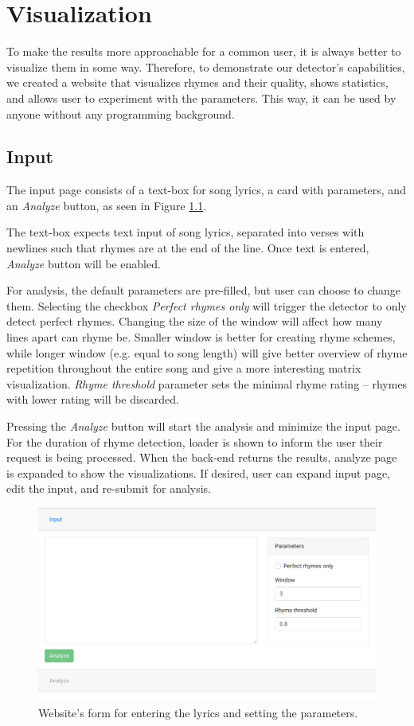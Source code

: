 \chapter{Visualization}\label{visualization}
To make the results more approachable for a common user, it is always better to visualize them in some way. Therefore, to demonstrate our detector's capabilities, we created a website that visualizes rhymes and their quality, shows statistics, and allows user to experiment with the parameters. This way, it can be used by anyone without any programming background.

\section{Input}
The input page consists of a text-box for song lyrics, a card with parameters, and an \textit{Analyze} button, as seen in Figure \ref{web-form}.

The text-box expects text input of song lyrics, separated into verses with newlines such that rhymes are at the end of the line. Once text is entered, \textit{Analyze} button will be enabled.

For analysis, the default parameters are pre-filled, but user can choose to change them. Selecting the checkbox \textit{Perfect rhymes only} will trigger the detector to only detect perfect rhymes. Changing the size of the window will affect how many lines apart can rhyme be. Smaller window is better for creating rhyme schemes, while longer window (e.g. equal to song length) will give better overview of rhyme repetition throughout the entire song and give a more interesting matrix visualization. \textit{Rhyme threshold} parameter sets the minimal rhyme rating -- rhymes with lower rating will be discarded.

Pressing the \textit{Analyze} button will start the analysis and minimize the input page. For the duration of rhyme detection, loader is shown to inform the user their request is being processed. When the back-end returns the results, analyze page is expanded to show the visualizations. If desired, user can expand input page, edit the input, and re-submit for analysis.

\begin{figure}[h]\centering
	\includegraphics[scale=0.3]{../img/web-empty-form.png}
	\caption{Website's form for entering the lyrics and setting the parameters.}
	\label{web-form}
\end{figure}

